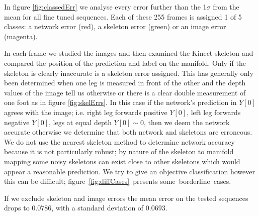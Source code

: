 \documentclass[11pt]{article} %
\begin{document}
In figure \ref{fig:classedErr} we analyse every error further than the 1$\sigma$ from the mean for all fine tuned sequences. Each of these 255 frames is assigned 1 of 5 classes: a network error (red), a skeleton error (green) or an image error (magenta).

In each frame we studied the images and then examined the Kinect skeleton and compared the position of the prediction and label on the manifold. Only if the skeleton is clearly inaccurate is a skeleton error assigned. This has generally only been determined when one leg is measured in front of the other and the depth values of the image tell us otherwise or there is a clear double measurement of one foot as in figure \ref{fig:skelErrs}. In this case if the network's prediction in $Y[0]$ agrees with the image; i.e. right leg forwards positive $Y[0]$,  left leg forwards negative $Y[0]$, legs at equal depth $Y[0]\sim 0$, then we deem the network accurate otherwise we determine that both network and skeletons are erroneous. We do not use the nearest skeleton method to determine network accuracy because it is not particularly robust; by nature of the skeleton to manifold mapping some noisy skeletons can exist close to other skeletons which would appear a reasonable prediction. We try to give an objective classification however this can be difficult; figure~\ref{fig:diffCases}~presents some~borderline~cases. 

If we exclude skeleton and image errors the mean error on the tested sequences drops to 0.0786, with a standard deviation of 0.0693.
\end{document}

